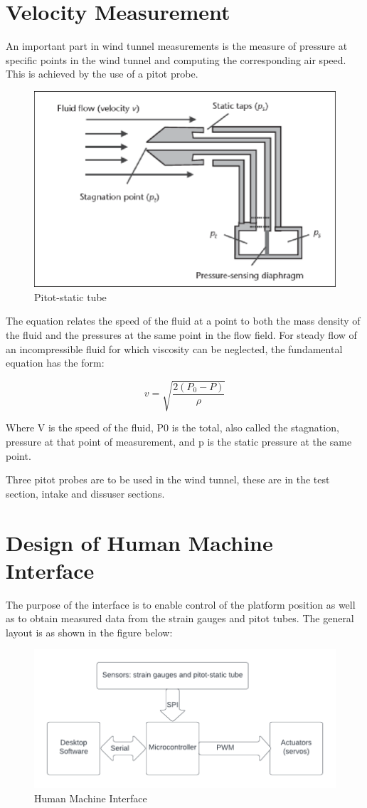\section{Velocity Measurement}
An important part in wind tunnel measurements is the measure of pressure at specific points in the wind tunnel and computing the corresponding air speed. This is achieved by the use of a pitot probe. 
\begin{center}
\begin{figure}
\centering
\includegraphics[width=0.6\linewidth]{Figures/pitot}
\caption[Pitot-static tube]{Pitot-static tube \cite{noauthor_wind_nodate}}
\end{figure}
\end{center}
The equation relates the speed of the fluid at a point to both the mass density of the fluid and the pressures at the same point in the flow field. For steady flow of an incompressible fluid for which viscosity can be neglected, the fundamental equation has the form:

$$ v = \sqrt{\frac{2(P_{0} - P)}{\rho}}$$

Where V is the speed of the fluid, P0 is the total, also called the stagnation, pressure at that point of measurement, and p is the static pressure at the same point.

Three pitot probes are to be used in the wind tunnel, these are in the test section, intake and dissuser sections.

\section{Design of Human Machine Interface}
The purpose of the interface is to enable control of the platform position as well as to obtain measured data from the strain gauges and pitot tubes. 
The general layout is as shown in the figure below:
\begin{center}
\begin{figure}
\centering
\includegraphics{Figures/interface}
\caption[Human Machine Interface]{Human Machine Interface}
\end{figure}
\end{center}


